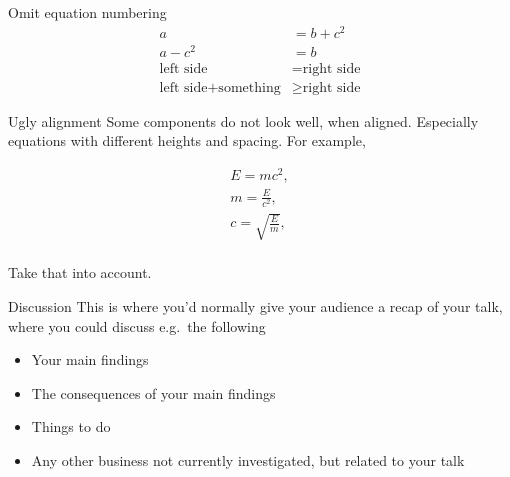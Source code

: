 \documentclass[
  10pt,
  ignorenonframetext,
]{beamer}
\providecommand{\tightlist}{%
  \setlength{\itemsep}{0pt}\setlength{\parskip}{0pt}}
\begin{document}
\begin{frame}{Omit equation numbering}
\protect\hypertarget{omit-equation-numbering}{}
\begin{align*} 
a &= b + c^2\\
a - c^2 &= b\\
\textrm{left side} &= \textrm{right side}\\
\textrm{left side} + \textrm{something} &\geq \textrm{right side}
\end{align*}
\end{frame}

\begin{frame}{Ugly alignment}
\protect\hypertarget{ugly-alignment}{}
Some components do not look well, when aligned. Especially equations
with different heights and spacing. For example,

\begin{align} 
E = mc^2, \\
m =  \frac{E}{c^2}, \\
c =  \sqrt{\frac{E}{m}}, \\
\end{align}

Take that into account.
\end{frame}

\begin{frame}{Discussion}
\protect\hypertarget{discussion}{}
This is where you'd normally give your audience a recap of your talk,
where you could discuss e.g.~the following

\begin{itemize}
\tightlist
\item
  Your main findings
\item
  The consequences of your main findings
\item
  Things to do
\item
  Any other business not currently investigated, but related to your
  talk
\end{itemize}
\end{frame}
\end{document}
